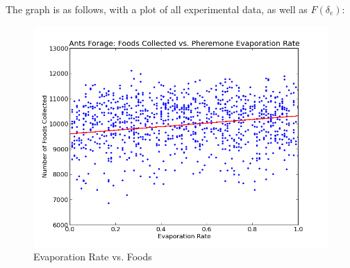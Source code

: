 \documentclass{article}
\begin{document}
The graph is as follows, with a plot of all experimental data, as well as $F(\delta_e)$:

\begin{figure}[H]
\centering
\includegraphics[width=\textwidth]{figs/a3}
\caption{Evaporation Rate vs. Foods}
\end{figure}
\end{document}
